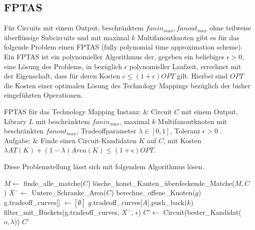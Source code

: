 \documentclass[11pt, a4paper, german]{article}
\newcommand{\TM}{Technology  Mapping }
\begin{document}
\subsection{FPTAS}
\label{subsec:fptas}
Für Circuits mit einem Output, beschränktem $fanin_{max}, fanout_{max}$ ohne teilweise überflüssige Subcircuits und mit maximal $k$ Multifanoutknoten gibt es für das folgende Problem einen FPTAS (fully polynomial time approximation scheme). Ein FPTAS ist ein polynomieller Algorithmus der, gegeben ein beliebiges $\epsilon > 0$, eine Lösung des Problems, in bezüglich $\epsilon$  polynomieller Laufzeit, errechnet mit der Eigenschaft, dass für deren Kosten $c \leq (1+\epsilon)OPT$ gilt. Hierbei sind $OPT$ die Kosten einer optimalen Lösung des Technology Mappings bezüglich der bisher eingeführten Operationen.\\
 \begin{problem}[framed]{FPTAS für das \TM}
  Instanz:  & Circuit $C$ mit einem Output, Library $L$ mit beschr\"anktem $fanin_{max}$, maximal $k$ Multifanoutknoten mit beschränkten $fanout_{max}$, Tradeoffparameter $\lambda \in [0,1]$, Toleranz $\epsilon > 0$ .\\
  Aufgabe: &  Finde einen Circuit-Kandidaten $K$ auf $C$, mit Kosten $\lambda AT(K) + (1-\lambda)Area(K) \leq (1+\epsilon)OPT$.
\end{problem}
Diese Problemstellung lässt sich mit folgendem Algorithmus lösen.\\

\LinesNumbered
\begin{algorithm}[H]
\DontPrintSemicolon
\caption{FPTAS f\"ur das TM mit Konvexkombination}

   $M \gets$ finde\_alle\_matche($C$)\;
   lösche\_konst\_Kanten\_überdeckende\_Matche($M, C$)\;
   $X^- \gets$ Untere\_Schranke\_Area($C$)\;
        {
			berechne\_offene\_Knoten($g$)\;	 
        }
  {
    g.tradeoff\_curves[] $\gets [\emptyset]$\;
    {
      {
        {
        	 {
			$g$.tradeoff\_curves[$A$].push\_back($k$)\;      	 
        	 }  
        }
      }
    }
    filter\_mit\_Buckets(g.tradeoff\_curves, $X^-$, $\epsilon$)\;
  }
  $C' \gets $ Circuit(bester\_Kandidat($o, \lambda$))\;
  \Return $C'$\;
\end{algorithm}\ \\
\end{document}
